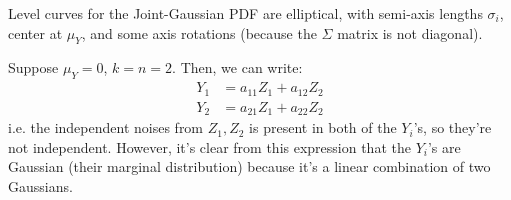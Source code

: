 \begin{note}
    Level curves for the Joint-Gaussian PDF are elliptical, with semi-axis lengths $\sigma_i$, center at $\mu_Y$, and some axis rotations (because the $\Sigma$ matrix is not diagonal).
\end{note}

\begin{example}[2-Dimensional J-Gs]
    Suppose $\mu_Y = 0$, $k = n = 2$. Then, we can write:
    \begin{align*}
        Y_1 &= a_{11} Z_1 + a_{12} Z_2 \\
        Y_2 &= a_{21} Z_1 + a_{22} Z_2
    \end{align*}
    i.e. the independent noises from $Z_1, Z_2$ is present in both of the $Y_i$'s, so they're not independent.
    However, it's clear from this expression that the $Y_i$'s are Gaussian (their marginal distribution) because it's a linear combination of two Gaussians.
\end{example}

